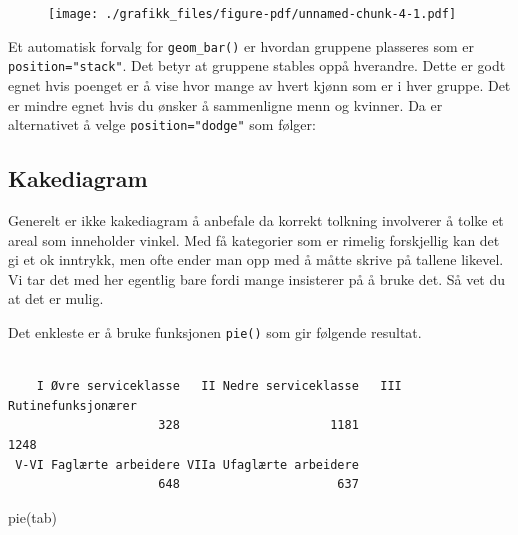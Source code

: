 \documentclass[
  letterpaper,
  DIV=11,
  numbers=noendperiod]{scrreprt}
\newenvironment{Shaded}{\begin{snugshade}}{\end{snugshade}}
\newcommand{\FunctionTok}[1]{\textcolor[rgb]{0.28,0.35,0.67}{#1}}
\newcommand{\NormalTok}[1]{\textcolor[rgb]{0.00,0.23,0.31}{#1}}
\newcommand{\OtherTok}[1]{\textcolor[rgb]{0.00,0.23,0.31}{#1}}
\newcommand{\SpecialCharTok}[1]{\textcolor[rgb]{0.37,0.37,0.37}{#1}}
\theoremstyle{definition}
\theoremstyle{remark}
\begin{document}
\begin{figure}[H]

{\centering \texttt{[image: ./grafikk\_files/figure-pdf/unnamed-chunk-4-1.pdf]}

}

\end{figure}

Et automatisk forvalg for \texttt{geom\_bar()} er hvordan gruppene
plasseres som er \texttt{position="stack"}. Det betyr at gruppene
stables oppå hverandre. Dette er godt egnet hvis poenget er å vise hvor
mange av hvert kjønn som er i hver gruppe. Det er mindre egnet hvis du
ønsker å sammenligne menn og kvinner. Da er alternativet å velge
\texttt{position="dodge"} som følger:

\hypertarget{kakediagram}{%
\subsection{Kakediagram}\label{kakediagram}}

Generelt er ikke kakediagram å anbefale da korrekt tolkning involverer å
tolke et areal som inneholder vinkel. Med få kategorier som er rimelig
forskjellig kan det gi et ok inntrykk, men ofte ender man opp med å
måtte skrive på tallene likevel. Vi tar det med her egentlig bare fordi
mange insisterer på å bruke det. Så vet du at det er mulig.

Det enkleste er å bruke funksjonen \texttt{pie()} som gir følgende
resultat.

\begin{Shaded}
\end{Shaded}

\begin{verbatim}

    I Øvre serviceklasse   II Nedre serviceklasse   III Rutinefunksjonærer 
                     328                     1181                     1248 
 V-VI Faglærte arbeidere VIIa Ufaglærte arbeidere 
                     648                      637 
\end{verbatim}

\begin{Shaded}
\begin{Highlighting}[]
\FunctionTok{pie}\NormalTok{(tab)}
\end{Highlighting}
\end{Shaded}
\end{document}
